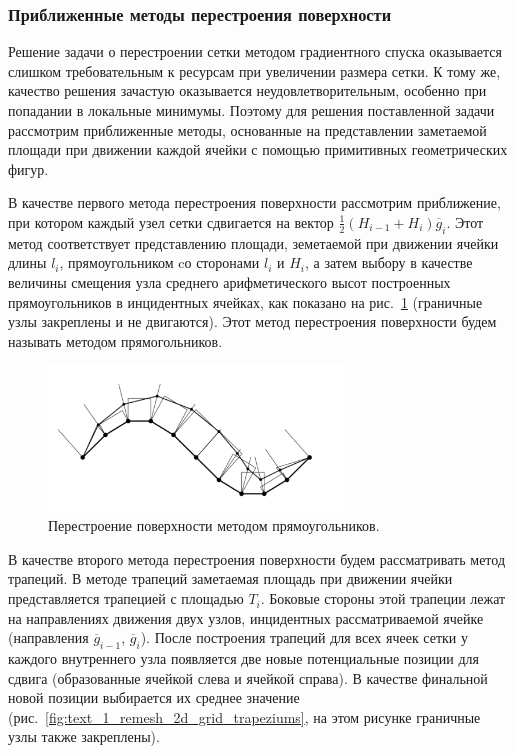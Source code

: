 \subsubsection{Приближенные методы перестроения поверхности}

Решение задачи о перестроении сетки методом градиентного спуска оказывается слишком требовательным к ресурсам при увеличении размера сетки.
К тому же, качество решения зачастую оказывается неудовлетворительным, особенно при попадании в локальные минимумы.
Поэтому для решения поставленной задачи рассмотрим приближенные методы, основанные на представлении заметаемой площади при движении каждой ячейки с помощью примитивных геометрических фигур.

В качестве первого метода перестроения поверхности рассмотрим приближение, при котором каждый узел сетки сдвигается на вектор $\frac{1}{2}(H_{i - 1} + H_i)\overline{g}_i$.
Этот метод соответствует представлению площади, земетаемой при движении ячейки длины $l_i$, прямоугольником cо сторонами $l_i$ и $H_i$, а затем выбору в качестве величины смещения узла среднего арифметического высот построенных прямоугольников в инцидентных ячейках, как показано на рис.~\ref{fig:text_1_remesh_2d_grid_rectangles} (граничные узлы закреплены и не двигаются).
Этот метод перестроения поверхности будем называть методом прямогольников\label{term:method_remesh_rect}.

\begin{figure}[ht]
\centering
\includegraphics[width=0.7\textwidth]{pics/text_1_remesh_2d/grid_rectangles.pdf}
\singlespacing
{}\caption{Перестроение поверхности методом прямоугольников.}
\label{fig:text_1_remesh_2d_grid_rectangles}
\end{figure}

В качестве второго метода перестроения поверхности будем рассматривать метод трапеций\label{term:method_remesh_trap}.
В методе трапеций заметаемая площадь при движении ячейки представляется трапецией с площадью $T_i$.
Боковые стороны этой трапеции лежат на направлениях движения двух узлов, инцидентных рассматриваемой ячейке (направления $\overline{g}_{i - 1}$, $\overline{g}_i$).
После построения трапеций для всех ячеек сетки у каждого внутреннего узла появляется две новые потенциальные позиции для сдвига (образованные ячейкой слева и ячейкой справа).
В качестве финальной новой позиции выбирается их среднее значение (рис.~\ref{fig:text_1_remesh_2d_grid_trapeziums}, на этом рисунке граничные узлы также закреплены).

